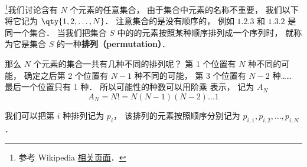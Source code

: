 


\footnote{参考 Wikipedia \href{https://en.wikipedia.org/wiki/Permutation}{相关页面}．}我们讨论含有 $N$ 个元素的任意集合， 由于集合中元素的名称不重要， 我们以下将它记为 $\qty{1,2,\dots, N}$． 注意集合的是没有顺序的， 例如 $\qty{1,2,3}$ 和 $\qty{1,3,2}$ 是同一个集合． 当我们把集合 $S$ 中的的元素按照某种顺序排列成一个序列时， 就称为它是集合 $S$ 的一种\textbf{排列（permutation）}．

那么 $N$ 个元素的集合一共有几种不同的排列呢？ 第 1 个位置有 $N$ 种不同的可能， 确定之后第 2 个位置有 $N-1$ 种不同的可能， 第 3 个位置有 $N-2$ 种…… 最后一个位置只有 1 种． 所以可能性的种数可以用阶乘 表示， 记为 $A_N$
\begin{equation}
A_N = N! = N(N-1)(N-2)\dots 1
\end{equation}

我们可以把第 $i$ 种排列记为 $p_i$， 该排列的元素按照顺序分别记为 $p_{i,1}, p_{i,2}, \dots, p_{i,N}$．
